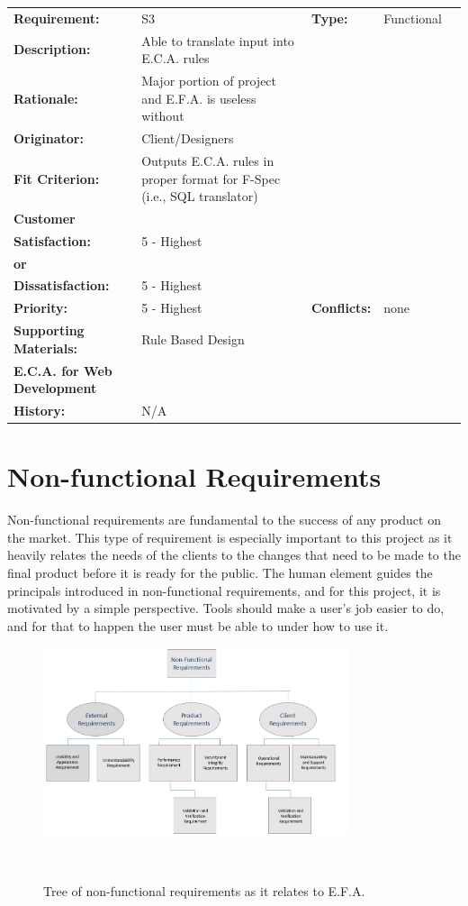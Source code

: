 \documentclass[12pt]{report}
\begin{document}
\begin{tabular}{>{\bfseries}m{3cm} m{8.5cm} >{\bfseries}m{2cm} m{3cm}l}
	Requirement:  & S3         & Type: & Functional \\ 
	Description:  & Able to translate input into E.C.A. rules & &
	\\	Rationale: & Major portion of project and E.F.A. is useless without & &
	\\	Originator: & Client/Designers & &
	\\	Fit Criterion: & Outputs E.C.A. rules in proper format for F-Spec (i.e., SQL 
	translator) & &
	\\	Customer \\ Satisfaction: & 5 - Highest    \\ or&  \\ Dissatisfaction: & 5 - Highest
	\\	Priority: & 5 - Highest & Conflicts: & none
	\\	Supporting Materials: & Rule Based Design \\ E.C.A. for Web Development &   & 
	\\	History: & N/A & &
\end{tabular}

\chapter{Non-functional Requirements}\label{ch:NonFunc}
Non-functional requirements are fundamental to the success of any product on the market. This type 
of requirement is especially important to this project as it heavily relates the needs of the 
clients to the changes that need to be made to the final product before it is ready for the public. 
The human element guides the principals introduced in non-functional requirements, and for this 
project, it is motivated by a simple perspective. Tools should make a user’s job easier to do, and 
for that to happen the user must be able to under how to use it. 
\begin{figure}[!htb]
	\centering
	\includegraphics[width=0.8\textwidth]{../figures/NONFUNCTIONAL}
	\caption{Tree of non-functional requirements as it relates to E.F.A.}~\label{fig:figure2}
\end{figure}
\end{document}
